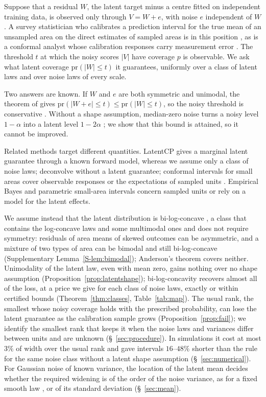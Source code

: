 \documentclass[lineno]{biometrika}
\newcommand{\pr}{\mathrm{pr}}
\begin{document}
Suppose that a residual $W$, the latent target minus a centre fitted on independent training data, is observed only through $V = W + e$, with noise $e$ independent of $W$. A survey statistician who calibrates a prediction interval for the true mean of an unsampled area on the direct estimates of sampled areas is in this position \citep{fay1979}, as is a conformal analyst whose calibration responses carry measurement error \citep{einbinder2024, cohen2025}. The threshold $t$ at which the noisy scores $|V|$ have coverage $p$ is observable. We ask what latent coverage $\pr(|W| \le t)$ it guarantees, uniformly over a class of latent laws and over noise laws of every scale.

Two answers are known. If $W$ and $e$ are both symmetric and unimodal, the theorem of \citet{anderson1955} gives $\pr(|W + e| \le t) \le \pr(|W| \le t)$, so the noisy threshold is conservative \citep{einbinder2024}. Without a shape assumption, median-zero noise turns a noisy level $1 - \alpha$ into a latent level $1 - 2\alpha$ \citep[Proposition~2.3]{guille2024}; we show that this bound is attained, so it cannot be improved.

Related methods target different quantities. LatentCP \citep{zheng2026} gives a marginal latent guarantee through a known forward model, whereas we assume only a class of noise laws; \citet{cohen2025} deconvolve without a latent guarantee; conformal intervals for small areas cover observable responses \citep{bersson2024} or the expectations of sampled units \citep{zhang2026}. Empirical Bayes and parametric small-area intervals \citep{armstrong2022, ignatiadis2022, hallmaiti2006, yoshimori2014} concern sampled units or rely on a model for the latent effects.

We assume instead that the latent distribution is bi-log-concave \citep{dumbgen2017}, a class that contains the log-concave laws and some multimodal ones and does not require symmetry: residuals of area means of skewed outcomes can be asymmetric, and a mixture of two types of area can be bimodal and still bi-log-concave (Supplementary Lemma~\ref{S-lem:bimodal}); Anderson's theorem covers neither. Unimodality of the latent law, even with mean zero, gains nothing over no shape assumption (Proposition~\ref{prop:latentshape}); bi-log-concavity recovers almost all of the loss, at a price we give for each class of noise laws, exactly or within certified bounds (Theorem~\ref{thm:classes}, Table~\ref{tab:map}). The usual rank, the smallest whose noisy coverage holds with the prescribed probability, can lose the latent guarantee as the calibration sample grows (Proposition~\ref{prop:fail}); we identify the smallest rank that keeps it when the noise laws and variances differ between units and are unknown (\S~\ref{sec:procedure}). In simulations it cost at most $3\%$ of width over the usual rank and gave intervals $16$--$48\%$ shorter than the rule for the same noise class without a latent shape assumption (\S~\ref{sec:numerical}). For Gaussian noise of known variance, the location of the latent mean decides whether the required widening is of the order of the noise variance, as for a fixed smooth law \citep{jochmans2024}, or of its standard deviation (\S~\ref{sec:mean}).
\end{document}
